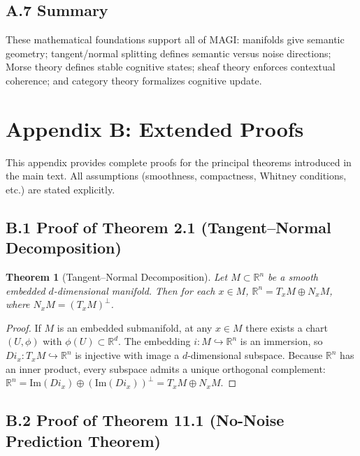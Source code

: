 \documentclass[11pt,a4paper,twocolumn]{article}
\newtheorem*{theorem*}{Theorem}
\begin{document}
\subsection*{A.7 Summary}

These mathematical foundations support all of MAGI: manifolds give
semantic geometry; tangent/normal splitting defines semantic versus noise
directions; Morse theory defines stable cognitive states; sheaf theory
enforces contextual coherence; and category theory formalizes cognitive
update.


\section*{Appendix B: Extended Proofs}

This appendix provides complete proofs for the principal theorems
introduced in the main text. All assumptions (smoothness, compactness,
Whitney conditions, etc.) are stated explicitly.

\subsection*{B.1 Proof of Theorem 2.1 (Tangent--Normal Decomposition)}

\begin{theorem*}[Tangent--Normal Decomposition]
Let $M \subset \mathbb{R}^n$ be a smooth embedded $d$-dimensional
manifold. Then for each $x \in M$,
$\mathbb{R}^n = T_x M \oplus N_x M$, where $N_x M = (T_xM)^\perp$.
\end{theorem*}

\begin{proof}
If $M$ is an embedded submanifold, at any $x \in M$ there exists a
chart $(U,\phi)$ with $\phi(U) \subset \mathbb{R}^d$. The embedding
$i: M \hookrightarrow \mathbb{R}^n$ is an immersion, so
$D i_x : T_x M \hookrightarrow \mathbb{R}^n$ is injective with image a
$d$-dimensional subspace. Because $\mathbb{R}^n$ has an inner product,
every subspace admits a unique orthogonal complement:
$\mathbb{R}^n = \mathrm{Im}(D i_x) \oplus (\mathrm{Im}(D i_x))^\perp
= T_x M \oplus N_x M$.
\end{proof}

\subsection*{B.2 Proof of Theorem 11.1 (No-Noise Prediction Theorem)}
\end{document}
